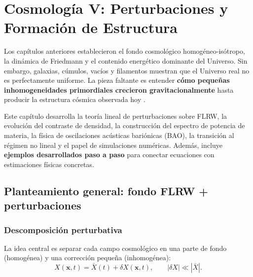 
\chapter{Cosmología V: Perturbaciones y Formación de Estructura}
\label{cap:perturbaciones_estructura}

Los capítulos anteriores establecieron el fondo cosmológico homogéneo-isótropo, la dinámica de Friedmann y el contenido energético dominante del Universo. Sin embargo, galaxias, cúmulos, vacíos y filamentos muestran que el Universo real no es perfectamente uniforme. La pieza faltante es entender \textbf{cómo pequeñas inhomogeneidades primordiales crecieron gravitacionalmente} hasta producir la estructura cósmica observada hoy \cite{Peebles1993, Dodelson2003, Weinberg2008, Ryden2017, Planck2020}.

Este capítulo desarrolla la teoría lineal de perturbaciones sobre FLRW, la evolución del contraste de densidad, la construcción del espectro de potencia de materia, la física de oscilaciones acústicas bariónicas (BAO), la transición al régimen no lineal y el papel de simulaciones numéricas. Además, incluye \textbf{ejemplos desarrollados paso a paso} para conectar ecuaciones con estimaciones físicas concretas.

\section{Planteamiento general: fondo FLRW + perturbaciones}
\label{sec:planteamiento_perturbaciones}

\subsection{Descomposición perturbativa}

La idea central es separar cada campo cosmológico en una parte de fondo (homogénea) y una corrección pequeña (inhomogénea):
\begin{equation}
X(\mathbf{x},t)=\bar X(t)+\delta X(\mathbf{x},t),
\qquad
\left|\delta X\right|\ll\left|\bar X\right|.
\end{equation}

